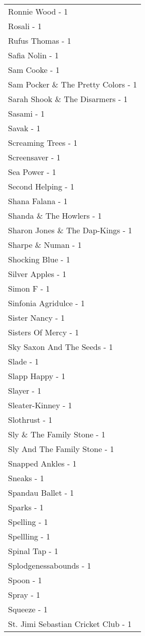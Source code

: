 \documentclass[
]{article}
\begin{document}
\begin{longtable}{l}
Ronnie Wood - 1 \\ 
Rosali - 1 \\ 
Rufus Thomas - 1 \\ 
Safia Nolin - 1 \\ 
Sam Cooke - 1 \\ 
Sam Pocker \& The Pretty Colors - 1 \\ 
Sarah Shook \& The Disarmers - 1 \\ 
Sasami - 1 \\ 
Savak - 1 \\ 
Screaming Trees - 1 \\ 
Screensaver - 1 \\ 
Sea Power - 1 \\ 
Second Helping - 1 \\ 
Shana Falana - 1 \\ 
Shanda \& The Howlers - 1 \\ 
Sharon Jones \& The Dap-Kings - 1 \\ 
Sharpe \& Numan - 1 \\ 
Shocking Blue - 1 \\ 
Silver Apples - 1 \\ 
Simon F - 1 \\ 
Sinfonia Agridulce - 1 \\ 
Sister Nancy - 1 \\ 
Sisters Of Mercy - 1 \\ 
Sky Saxon And The Seeds - 1 \\ 
Slade - 1 \\ 
Slapp Happy - 1 \\ 
Slayer - 1 \\ 
Sleater-Kinney - 1 \\ 
Slothrust - 1 \\ 
Sly \& The Family Stone - 1 \\ 
Sly And The Family Stone - 1 \\ 
Snapped Ankles - 1 \\ 
Sneaks - 1 \\ 
Spandau Ballet - 1 \\ 
Sparks - 1 \\ 
Spelling - 1 \\ 
Spellling - 1 \\ 
Spinal Tap - 1 \\ 
Splodgenessabounds - 1 \\ 
Spoon - 1 \\ 
Spray - 1 \\ 
Squeeze - 1 \\ 
St. Jimi Sebastian Cricket Club - 1 \\ 

\end{longtable}
\end{document}
